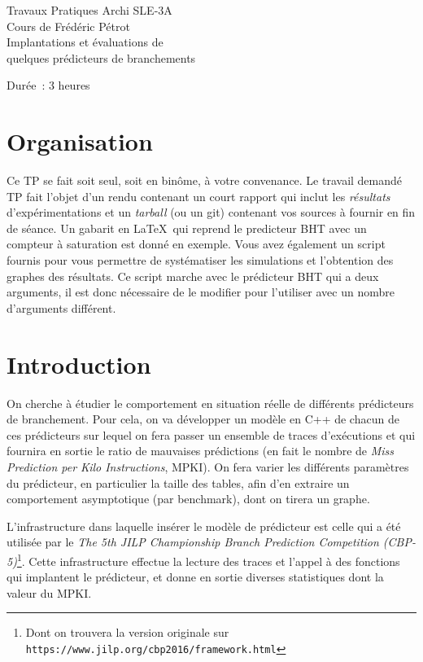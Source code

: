 \documentclass[a4paper]{article}
\begin{document}
\begin{center}
\large
Travaux Pratiques Archi SLE-3A\\
Cours de Frédéric Pétrot\\
\LARGE
Implantations et évaluations de\\
quelques prédicteurs de branchements\\
\large

Durée~: 3 heures
\end{center}
\section{Organisation}
Ce TP se fait soit seul, soit en binôme, à votre convenance.
Le travail demandé TP fait l'objet d'un rendu contenant un court rapport qui inclut les \emph{résultats} d'expérimentations et un \emph{tarball} (ou un git) contenant vos sources à fournir en fin de séance.
Un gabarit en \LaTeX\ qui reprend le predicteur BHT avec un compteur à saturation est donné en exemple.
Vous avez également un script fournis pour vous permettre de systématiser les simulations et l'obtention des graphes des résultats.
Ce script marche avec le prédicteur BHT qui a deux arguments, il est donc nécessaire de le modifier pour l'utiliser avec un nombre d'arguments différent.

\section{Introduction}
On cherche à étudier le comportement en situation réelle de différents prédicteurs de branchement.
Pour cela, on va développer un modèle en C++ de chacun de ces prédicteurs sur lequel on fera passer un ensemble de traces d'exécutions et qui fournira en sortie le ratio de mauvaises prédictions (en fait le nombre de \emph{Miss Prediction per Kilo Instructions}, MPKI).
On fera varier les différents paramètres du prédicteur, en particulier la taille des tables, afin d'en extraire un comportement asymptotique (par benchmark), dont on tirera un graphe.

L'infrastructure dans laquelle insérer le modèle de prédicteur est celle qui a été utilisée par le \emph{The 5th JILP Championship Branch Prediction Competition (CBP-5)}\footnote{Dont on trouvera la version originale sur \texttt{https://www.jilp.org/cbp2016/framework.html}}.
Cette infrastructure effectue la lecture des traces et l'appel à des fonctions qui implantent le prédicteur, et donne en sortie diverses statistiques dont la valeur du MPKI.
\end{document}
